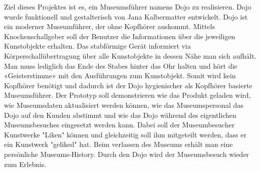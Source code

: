 Ziel dieses Projektes ist es, ein Museumsführer namens Dojo zu realisieren. Dojo wurde funktionell und gestalterisch von Jana Kalbermatter entwickelt. Dojo ist ein moderner Museumführer, der ohne Kopfhörer auskommt. Mittels Knochenschallgeber soll der Benutzer die Informationen über die jeweiligen Kunstobjekte erhalten. Das stabförmige Gerät informiert via Körperschallübertragung über alle Kunstobjekte in dessen Nähe man sich aufhält. Man muss lediglich das Ende des Stabes hinter das Ohr halten und hört die «Geisterstimme» mit den Ausführungen zum Kunstobjekt. Somit wird kein Kopfhörer benötigt und dadurch ist der Dojo hygienischer als Kopfhörer basierte Museumsführer.
Der Prototyp soll demonstrieren wie das Produkt geladen wird, wie Museumsdaten aktualisiert werden können, wie das Museumspersonal das Dojo auf den Kunden abstimmt und wie das Dojo während des eigentlichen Museumsbesuches eingesetzt werden kann. Dabei soll der Museumbesucher Kunstwerke "Liken" können und gleichzeitig soll ihm mitgeteilt werden, dass er ein Kunstwerk "geliked" hat.
Beim verlassen des Museums erhält man eine persönliche Museums-History. Durch den Dojo wird der Museumsbesuch wieder zum Erlebnis.
